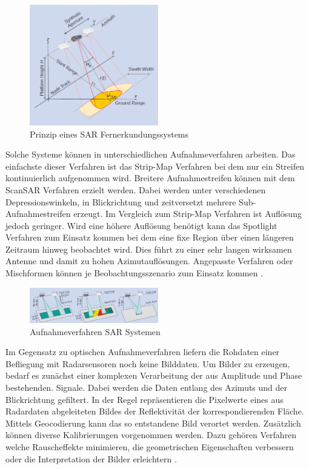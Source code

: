 \begin{figure}[H]
    \centering
    \includegraphics[width=0.5\textwidth]{Bilder/SAR_Prinzip.png}
    \caption{Prinzip eines SAR Fernerkundungssystems \cite{tutorial_on_sar}}
    \label{fig:sar_prinzip}
\end{figure}

Solche Systeme können in unterschiedlichen Aufnahmeverfahren arbeiten. Das einfachste dieser Verfahren ist das Strip-Map Verfahren bei dem nur ein Streifen 
kontinuierlich aufgenommen wird. Breitere Aufnahmestreifen können mit dem ScanSAR Verfahren erzielt werden. Dabei werden unter verschiedenen Depressionswinkeln, 
in Blickrichtung und zeitversetzt mehrere Sub-Aufnahmestreifen erzeugt. Im Vergleich zum Strip-Map Verfahren ist Auflösung jedoch geringer. 
Wird eine höhere Auflösung benötigt kann das Spotlight Verfahren zum Einsatz kommen bei dem eine fixe Region über einen längeren Zeitraum hinweg beobachtet wird. Dies führt zu 
einer sehr langen wirksamen Antenne und damit zu hohen Azimutauflösungen. 
Angepasste Verfahren oder Mischformen können je Beobachtungsszenario zum Einsatz kommen \cite{tutorial_on_sar}. 

\begin{figure}[H]
    \centering
    \includegraphics[width=0.5\textwidth]{Bilder/SAR_Modi.png}
    \caption{Aufnahmeverfahren SAR Systemen \cite{tutorial_on_sar}}
    \label{fig:sar_prinzip}
\end{figure}

Im Gegensatz zu optischen Aufnahmeverfahren liefern die Rohdaten 
einer Befliegung mit Radarsensoren noch keine Bilddaten. Um Bilder zu erzeugen, bedarf es zunächst einer komplexen Verarbeitung der aus Amplitude und Phase bestehenden. 
Signale. Dabei werden die Daten entlang des Azimuts und der Blickrichtung gefiltert. In der Regel repräsentieren die Pixelwerte eines aus Radardaten abgeleiteten Bildes 
der Reflektivität der korrespondierenden Fläche. Mittels Geocodierung kann das so entstandene Bild verortet werden. Zusätzlich können diverse Kalibrierungen vorgenommen 
werden. Dazu gehören Verfahren welche Rauscheffekte minimieren, die geometrischen Eigenschaften verbessern oder die Interpretation der Bilder erleichtern \cite{tutorial_on_sar}. 

